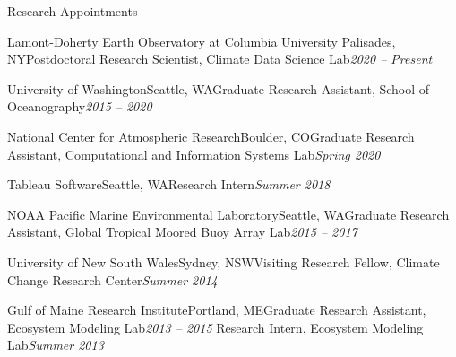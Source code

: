 \documentclass{resume} %
\begin{document}
\begin{rSection}{Research Appointments}

\begin{rSubsection}{Lamont-Doherty Earth Observatory at Columbia University}{ Palisades, NY}{Postdoctoral Research Scientist, Climate Data Science Lab}{\em 2020 – Present}
\end{rSubsection}


\begin{rSubsection}{University of Washington}{Seattle, WA}{Graduate Research Assistant, School of Oceanography}{\em 2015 – 2020}
\end{rSubsection}

\begin{rSubsection}{National Center for Atmospheric Research}{Boulder, CO}{Graduate Research Assistant, Computational and Information Systems Lab}{\em Spring 2020}
\end{rSubsection}

\begin{rSubsection}{Tableau Software}{Seattle, WA}{Research Intern}{\em Summer 2018}
\end{rSubsection}

\begin{rSubsection}{NOAA Pacific Marine Environmental Laboratory}{Seattle, WA}{Graduate Research Assistant, Global Tropical Moored Buoy Array Lab}{\em 2015 – 2017}
\end{rSubsection}


\begin{rSubsection}{University of New South Wales}{Sydney, NSW}{Visiting Research Fellow, Climate Change Research Center}{\em Summer 2014}
\end{rSubsection}

\begin{rSubsection}{Gulf of Maine Research Institute}{Portland, ME}{Graduate Research Assistant, Ecosystem Modeling Lab}{\em 2013 – 2015}
{Research Intern, Ecosystem Modeling Lab}{\hfill \em Summer 2013}
\end{rSubsection}

\end{rSection}

\end{document}
